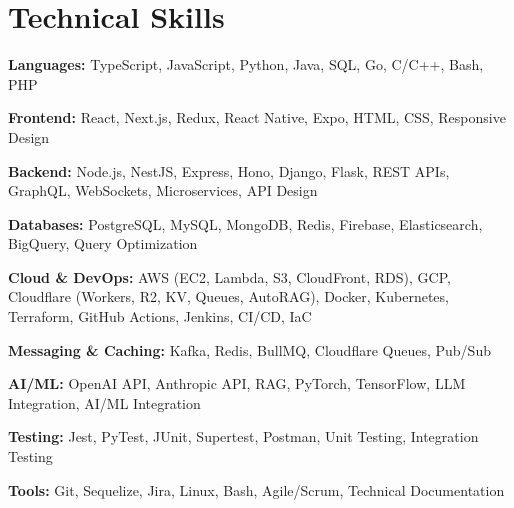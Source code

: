 \section{Technical Skills}
\begin{itemize}[leftmargin=0.15in, label={}, itemsep=1pt]
  \small{
  \item \textbf{Languages:} TypeScript, JavaScript, Python, Java, SQL, Go, C/C++, Bash, PHP
  \item \textbf{Frontend:} React, Next.js, Redux, React Native, Expo, HTML, CSS, Responsive Design
  \item \textbf{Backend:} Node.js, NestJS, Express, Hono, Django, Flask, REST APIs, GraphQL, WebSockets, Microservices, API Design
  \item \textbf{Databases:} PostgreSQL, MySQL, MongoDB, Redis, Firebase, Elasticsearch, BigQuery, Query Optimization
  \item \textbf{Cloud \& DevOps:} AWS (EC2, Lambda, S3, CloudFront, RDS), GCP, Cloudflare (Workers, R2, KV, Queues, AutoRAG), Docker, Kubernetes, Terraform, GitHub Actions, Jenkins, CI/CD, IaC
  \item \textbf{Messaging \& Caching:} Kafka, Redis, BullMQ, Cloudflare Queues, Pub/Sub
  \item \textbf{AI/ML:} OpenAI API, Anthropic API, RAG, PyTorch, TensorFlow, LLM Integration, AI/ML Integration
  \item \textbf{Testing:} Jest, PyTest, JUnit, Supertest, Postman, Unit Testing, Integration Testing
  \item \textbf{Tools:} Git, Sequelize, Jira, Linux, Bash, Agile/Scrum, Technical Documentation
  }
\end{itemize}
